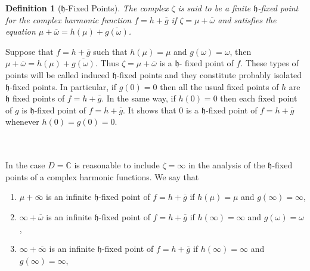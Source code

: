 \documentclass[a4paper,12pt,reqno]{amsart}
\newtheorem{definition}{Definition}
\begin{document}
\begin{definition}[$\mathfrak{h}$-Fixed Points]\cite{Some questions about complex harmonic functions}
The complex $\zeta$ is said to be a finite $\mathfrak{h}$-fixed point for the complex harmonic function $f=h+\overline{g}$ if $\zeta=\mu+\overline{\omega}$ and satisfies the equation $\mu+\overline{\omega}=h(\mu)+\overline{g(\omega)}$.


    
\end{definition}
Suppose that $f=h+\overline{g}$ such that $h(\mu)=\mu$ and $g(\omega)=\omega$, then $\mu+\overline{\omega}=h(\mu)+\overline{g(\omega)}$. Thus $\zeta=\mu+\overline{\omega}$ is a $\mathfrak{h}$- fixed point of $f$. These types of points will be called induced $\mathfrak{h}$-fixed points and they constitute probably isolated $\mathfrak{h}$-fixed points. In particular, if $g(0)=0$ then all the usual fixed points of $h$ are $\mathfrak{h}$ fixed points
 of $f=h+\overline{g}$. In the same way, if $h(0)=0$ then each fixed point of $g$ is $\mathfrak{h}$-fixed point of $f=h+\overline{g}$. It shows that 0 is a $\mathfrak{h}$-fixed point of  $f=h+\overline{g}$ whenever $h(0)=g(0)=0$.


${}$\\ ${}$\\

 In the case $D={\mathbb{C}}$ is reasonable to include $\zeta=\infty$ in the analysis of the $\mathfrak{h}$-fixed points of a complex harmonic functions. We say that
\begin{enumerate}
    \item[1.] $\mu+\overline{\infty}$ is an infinite $\mathfrak{h}$-fixed point of $f=h+\overline{g}$ if $h(\mu)=\mu$ and $g(\infty)=\infty$,
    \item[2.] $\infty+\overline{\omega}$ is an infinite $\mathfrak{h}$-fixed point of $f=h+\overline{g}$ if $h(\infty)=\infty$ and $g(\omega)=\omega$,
    \item[3.] $\infty+\overline{\infty}$ is an infinite $\mathfrak{h}$-fixed point of $f=h+\overline{g}$ if $h(\infty)=\infty$ and $g(\infty)=\infty$,
\end{enumerate}
\end{document}
